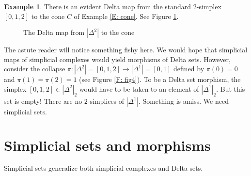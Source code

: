 \documentclass[12pt]{article}
\theoremstyle{plain}
\theoremstyle{definition}
\newtheorem{example}[theorem]{Example}
\begin{document}
\begin{example}
There is an evident Delta map from the standard $2$-simplex $[0,1,2]$ to the  cone $C$ of Example \ref{E: cone}. See Figure \ref{F: fig9}.
\end{example}


\begin{figure}[!htp]
\begin{center}
\end{center}
\caption{The Delta map from $|\Delta^2|$ to the cone}\label{F: fig9}
\end{figure}


The astute reader will notice something fishy here. We would hope that simplicial maps of simplicial complexes would yield morphisms of Delta sets. However, consider the collapse $\pi\colon|\Delta^2|=[0,1,2]\to |\Delta^1|=[0,1]$ defined by $\pi(0)=0$ and $\pi(1)=\pi(2)=1$ (see Figure \ref{F: fig4}). To be a Delta set morphism, the simplex $[0,1,2]\in |\Delta^2|_2$ would have to be taken to an element of $|\Delta^1|_2$. But this set is empty! There are no $2$-simplices of $|\Delta^1|$. Something is amiss. We need simplicial sets.













\section{Simplicial sets and morphisms}\label{S: simplicial sets}

Simplicial sets generalize both simplicial complexes and Delta sets. 
\end{document}
